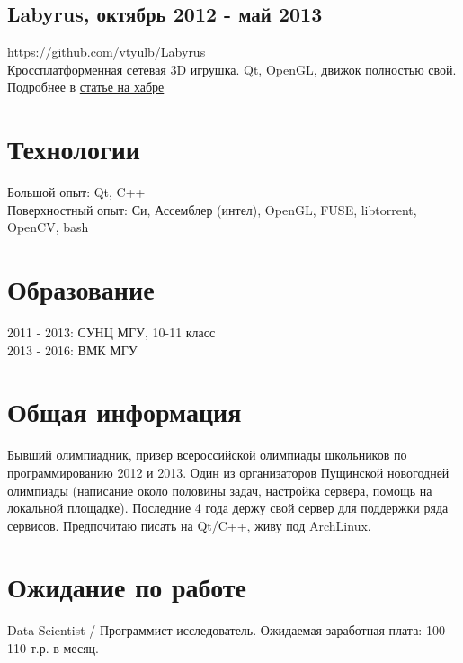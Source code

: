 \documentclass[a4paper, 8pt]{article}
\begin{document}
{	\subsection{Labyrus, октябрь 2012 - май 2013} {
		\href{https://github.com/vtyulb/Labyrus}{https://github.com/vtyulb/Labyrus}\\
		Кроссплатформенная сетевая 3D игрушка. Qt, OpenGL, движок полностью свой.\\
		Подробнее в \href{http://habrahabr.ru/post/177807}{статье на хабре}
	}
}

\section{Технологии} {
	Большой опыт: Qt, C++\\
	Поверхностный опыт: Си, Ассемблер (интел), OpenGL, FUSE, libtorrent, OpenCV, bash\\
}

\section{Образование} {
	2011 - 2013: СУНЦ МГУ, 10-11 класс\\
	2013 - 2016: ВМК МГУ
}

\section{Общая информация} {
	Бывший олимпиадник, призер всероссийской олимпиады школьников по программированию 2012 и 2013. Один из организаторов
	Пущинской новогодней олимпиады (написание около половины задач, настройка сервера, помощь на локальной площадке).
	Последние 4 года держу свой сервер для поддержки ряда сервисов. Предпочитаю писать на Qt/C++, живу под ArchLinux.
}

\section{Ожидание по работе} {
	Data Scientist / Программист-исследователь.
	Ожидаемая заработная плата: 100-110 т.р. в месяц.
}
\end{document}
